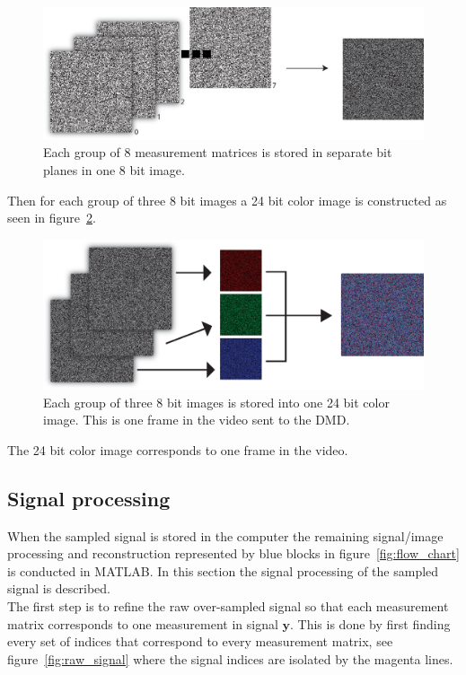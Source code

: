 \begin{figure}[H]
\includegraphics[width = 1\linewidth]{gfx/DMD_12.eps}
\caption{Each group of 8 measurement matrices is stored in separate  bit planes in one 8 bit image.}
	\label{fig:8_to_1_8}
\end{figure}

Then for each group of three 8 bit images a 24 bit color image is constructed as seen in figure~\ref{fig:3_8_to_1_3}. 

\begin{figure}[H]
\includegraphics[width = 1\linewidth]{gfx/DMD_2.eps}
\caption{Each group of three 8 bit images is stored into one 24 bit color image. This is one frame in the video sent to the DMD.}
	\label{fig:3_8_to_1_3}
\end{figure}

The 24 bit color image corresponds to one frame in the video.



\subsection{Signal processing}
\label{sec:signal_process}  
When the sampled signal is stored in the computer the remaining signal/image processing and reconstruction represented by blue blocks in figure~\ref{fig:flow_chart} is conducted in MATLAB. In this section the signal processing of the sampled signal is described.\\[0.1in]

The first step is to refine the raw over-sampled signal so that each measurement matrix corresponds to one measurement in signal $\mathbf{y}$. This is done by first finding every set of indices that correspond to every measurement matrix, see figure~\ref{fig:raw_signal} where the signal indices are isolated by the magenta lines.


